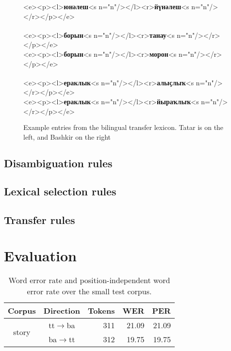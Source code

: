 \documentclass[11pt,a4paper]{article}
\begin{document}
\begin{figure*}
\begin{center}
\begin{texttt}
    <e><p><l>\textbf{юнәлеш}<s n="n"/></l><r>\textbf{йүнәлеш}<s n="n"/></r></p></e> \\
~\\
    <e><p><l>\textbf{борын}<s n="n"/></l><r>\textbf{танау}<s n="n"/></r></p></e> \\
    <e><p><l>\textbf{борын}<s n="n"/></l><r>\textbf{морон}<s n="n"/></r></p></e> \\
~\\
    <e><p><l>\textbf{ераклык}<s n="n"/></l><r>\textbf{алыҫлыҡ}<s n="n"/></r></p></e> \\
    <e><p><l>\textbf{ераклык}<s n="n"/></l><r>\textbf{йыраҡлыҡ}<s n="n"/></r></p></e>

\end{texttt}
\end{center}
\caption{Example entries from the bilingual transfer lexicon. Tatar is on the left, and Bashkir on the right}
\label{fig:bidix}
\end{figure*}

\subsection{Disambiguation rules}



\subsection{Lexical selection rules}



\subsection{Transfer rules}

\section{Evaluation}
\label{sec:eval}

\begin{table*}
  \begin{center}
  \begin{tabular}{c|c|r|r|r}
   Corpus                 & Direction         & Tokens  & WER    & PER    \\
  \hline
   \multirow{2}{*}{story} & tt$\rightarrow$ba & 311 & 21.09  & 21.09 \\
                          & ba$\rightarrow$tt & 312 & 19.75  & 19.75 \\
  \hline
  \end{tabular}
    \caption{Word error rate and position-independent word error rate over the small test corpus.}
    \label{table:wer}
  \end{center}
\end{table*}
\end{document}
